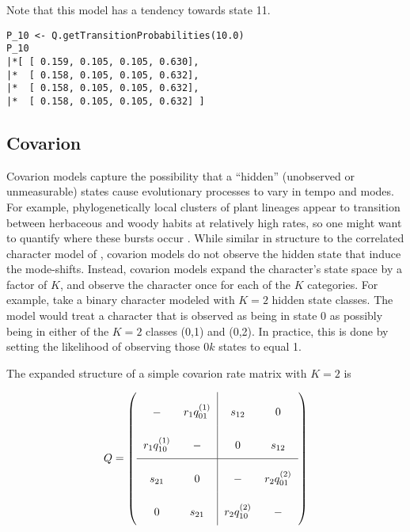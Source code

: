 Note that this model has a tendency towards state 11.

{\tt \begin{snugshade*}
\begin{lstlisting}
P_10 <- Q.getTransitionProbabilities(10.0)
P_10
|*[ [ 0.159, 0.105, 0.105, 0.630],
|*  [ 0.158, 0.105, 0.105, 0.632],
|*  [ 0.158, 0.105, 0.105, 0.632],
|*  [ 0.158, 0.105, 0.105, 0.632] ]
\end{lstlisting}
\end{snugshade*}}


\subsection{Covarion}

Covarion models \citep{tuffley98} capture the possibility that a ``hidden'' (unobserved or unmeasurable) states cause evolutionary processes to vary in tempo and modes.
For example, phylogenetically local clusters of plant lineages appear to transition between herbaceous and woody habits at relatively high rates, so one might want to quantify where these bursts occur \citep{beaulieu2013}.
While similar in structure to the correlated character model of \citet{pagel94}, covarion models do not observe the hidden state that induce the mode-shifts.
Instead, covarion models expand the character's state space by a factor of $K$, and observe the character once for each of the $K$ categories.
For example, take a binary character modeled with $K=2$ hidden state classes.
The model would treat a character that is observed as being in state 0 as possibly being in either of the $K=2$ classes (0,1) and (0,2).
In practice, this is done by setting the likelihood of observing those $0k$ states to equal 1.

The expanded structure of a simple covarion rate matrix with $K=2$ is

\begin{equation*}
Q = \left(
\arraycolsep=6pt\def\arraystretch{2.5}
\begin{array}{cc|cc}
- & r_1 q_{01}^{(1)} & s_{12} & 0 \\
r_1 q_{10}^{(1)} & - & 0 & s_{12} \\
\hline
s_{21} & 0 & - & r_2 q_{01}^{(2)} \\
0 & s_{21} & r_2 q_{10}^{(2)} & -  \\

\end{array}
\right)    
\end{equation*}

